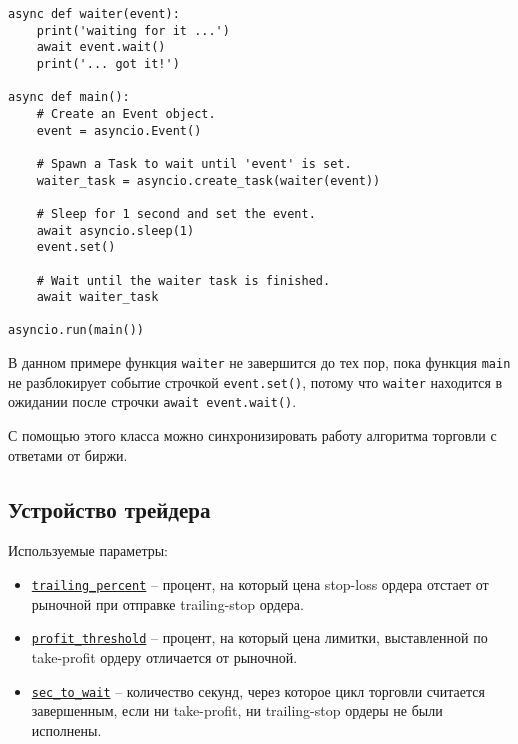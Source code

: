 \begin{verbatim}
async def waiter(event):
    print('waiting for it ...')
    await event.wait()
    print('... got it!')

async def main():
    # Create an Event object.
    event = asyncio.Event()

    # Spawn a Task to wait until 'event' is set.
    waiter_task = asyncio.create_task(waiter(event))

    # Sleep for 1 second and set the event.
    await asyncio.sleep(1)
    event.set()

    # Wait until the waiter task is finished.
    await waiter_task

asyncio.run(main())
\end{verbatim}

В данном примере функция \texttt{waiter} не завершится до тех пор, пока функция \texttt{main} не разблокирует событие строчкой \texttt{event.set()}, потому что \texttt{waiter} находится в ожидании после строчки \texttt{await event.wait()}.

С помощью этого класса можно синхронизировать работу алгоритма торговли с ответами от биржи.

\subsection{Устройство трейдера}

Используемые параметры:
\begin{itemize}
    \item \href{https://github.com/dexety/dex-trading-system/blob/ca0370d602f2dfa05262b9b8574002f965ac1502/research/ib-0002-cross-analysis/trader.py#L52}{\texttt{trailing\_percent}} -- процент, на который цена stop-loss ордера отстает от рыночной при отправке trailing-stop ордера.
    \item \href{https://github.com/dexety/dex-trading-system/blob/ca0370d602f2dfa05262b9b8574002f965ac1502/research/ib-0002-cross-analysis/trader.py#L54}{\texttt{profit\_threshold}} -- процент, на который цена лимитки, выставленной по take-profit ордеру отличается от рыночной.
    \item \href{https://github.com/dexety/dex-trading-system/blob/ca0370d602f2dfa05262b9b8574002f965ac1502/research/ib-0002-cross-analysis/trader.py#L55}{\texttt{sec\_to\_wait}} -- количество секунд, через которое цикл торговли считается завершенным, если ни take-profit, ни trailing-stop ордеры не были исполнены.
\end{itemize}

